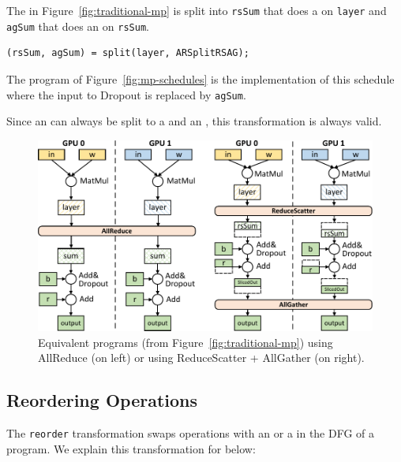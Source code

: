 
 The \allreduce in Figure~\ref{fig:traditional-mp} is split into \texttt{rsSum} that does a \reducescatter on \texttt{layer} and \texttt{agSum} that does an \allgather on \texttt{rsSum}.
{
\small
\begin{lstlisting}[language=DSL,numbers=none]
(rsSum, agSum) = split(layer, ARSplitRSAG);
\end{lstlisting}
}

The program  of Figure~\ref{fig:mp-schedules} is the implementation of this schedule where the input to Dropout is replaced by \texttt{agSum}.

 Since an \allreduce can always be split to a \reducescatter and an \allgather, this transformation is always valid.

\begin{figure}[t]
	\centering
	\includegraphics[width=.9\linewidth]{figures/reduceScatter}
	\caption{Equivalent programs (from Figure~\ref{fig:traditional-mp}) using AllReduce (on left) or using ReduceScatter + AllGather (on right).}
	\label{fig:model-parallel-using-reducescatter}
\end{figure}

\subsection{Reordering Operations}
The \texttt{reorder} transformation swaps operations with an \allgather or a \broadcast in the DFG of a program.
We explain this transformation for \allgather below: 

